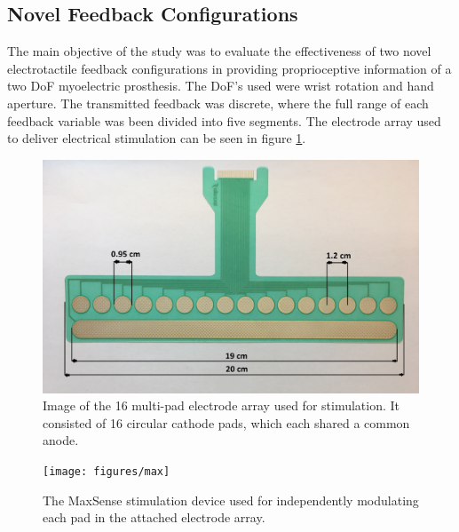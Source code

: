\subsection{Novel Feedback Configurations}
The main objective of the study was to evaluate the effectiveness of two novel electrotactile feedback configurations in providing proprioceptive information of a two DoF myoelectric prosthesis. 
The DoF's used were wrist rotation and hand aperture. The transmitted feedback was discrete, where the full range of each feedback variable was been divided into five segments. The electrode array used to deliver electrical stimulation can be seen in figure \ref{fig:pa:electrode}.
\begin{figure}[H]                 
	\includegraphics[width=1\textwidth]{figures/electrode}  
	\caption{Image of the 16 multi-pad electrode array used for stimulation. It consisted of 16 circular cathode pads, which each shared a common anode.}
	\label{fig:pa:electrode} 
\end{figure}
\begin{figure}[h]                 
	\texttt{[image: figures/max]}  
	\caption{The MaxSense stimulation device used for independently modulating each pad in the attached electrode array.}
	\label{fig:pa:max} 
\end{figure}   
